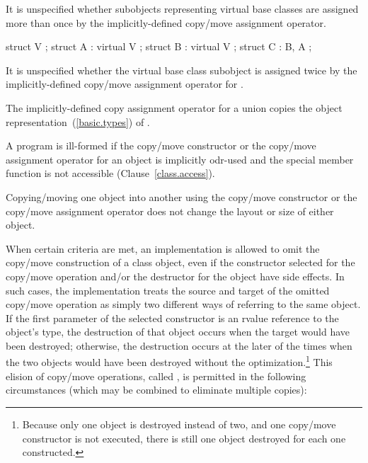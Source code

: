 %
It is unspecified whether subobjects representing virtual base classes
are assigned more than once by the implicitly-defined copy/move assignment
operator.
\begin{example}

\begin{codeblock}
struct V { };
struct A : virtual V { };
struct B : virtual V { };
struct C : B, A { };
\end{codeblock}

It is unspecified whether the virtual base class subobject
is assigned twice by the implicitly-defined copy/move assignment operator for
.
\end{example}

\pnum
The implicitly-defined copy assignment operator for a
union  copies the object representation~(\ref{basic.types}) of .%
%

\pnum
{}%
%
%
%
A program is ill-formed if the copy/move constructor or the copy/move assignment
operator for an object is implicitly odr-used and the special member function
is not accessible (Clause~\ref{class.access}).
\begin{note}
Copying/moving one object into another using the copy/move constructor or
the copy/move assignment operator does not change the layout or size of either
object.
\end{note}

\pnum
{}%
%
%
%
%
When certain criteria are met, an implementation is
allowed to omit the copy/move construction of a class object,
even if the constructor selected for the copy/move operation and/or the
destructor for the object have
%
side effects.  In such cases, the
implementation treats the source and target of the
omitted copy/move operation as simply two different ways of
referring to the same object. If the first parameter of the
selected constructor is an rvalue reference to the object's type,
the destruction of that object occurs when the target would have been destroyed;
otherwise, the destruction occurs at the later of the times when the
two objects would have been destroyed without the
optimization.\footnote{Because only one object is destroyed instead of two,
and one copy/move constructor
is not executed, there is still one object destroyed for each one constructed.}
This elision of copy/move operations, called
%
%
,
is permitted in the
following circumstances (which may be combined to
eliminate multiple copies):

